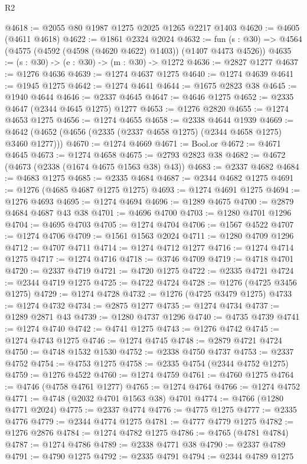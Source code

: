 \begin{lexlean}{R2}
\begin{coremodule}
@4618 := @2055 @80 @1987 @1275 @2025 @1265 @2217 @1403
@4620 := @4605 (@4611 @4618)
@4622 := @1861 @2324 @2024
@4632 := fun (s : @30) => @4564 (@4575 (@4592 (@4598 (@4620 @4622) @1403)) (@1407 @4473 @4526))
@4635 := (s : @30) -> (e : @30) -> (m : @30) -> @1272
@4636 := @2827 @1277
@4637 := @1276 @4636
@4639 := @1274 @4637 @1275
@4640 := @1274 @4639
@4641 := @1945 @1275
@4642 := @1274 @4641
@4644 := @1675 @2823 @38
@4645 := @1940 @4644
@4646 := @2337 @4645
@4647 := @4646 @1275
@4652 := @2335 @4647 (@2344 @4645 @1275) @1277
@4653 := @1276 @2820
@4655 := @1274 @4653 @1275
@4656 := @1274 @4655
@4658 := @2338 @4644 @1939
@4669 := @4642 (@4652 (@4656 (@2335 (@2337 @4658 @1275) (@2344 @4658 @1275) @3460 @1277)))
@4670 := @1274 @4669
@4671 := Bool.or
@4672 := @4671 @4645
@4673 := @1274 @4658
@4675 := @2793 @2823 @38
@4682 := @4672 (@4673 (@2338 (@1674 @4675 @1563 @38) @43))
@4683 := @2337 @4682
@4684 := @4683 @1275
@4685 := @2335 @4684
@4687 := @2344 @4682 @1275
@4691 := @1276 (@4685 @4687 @1275 @1275)
@4693 := @1274 @4691 @1275
@4694 := @1276 @4693
@4695 := @1274 @4694
@4696 := @1289 @4675
@4700 := @2879 @4684 @4687 @43 @38
@4701 := @4696 @4700
@4703 := @1280 @4701 @1296
@4704 := @4695 @4703
@4705 := @1274 @4704
@4706 := @1567 @4522
@4707 := @1274 @4706
@4709 := @1561 @1563 @2024
@4711 := @1280 @4709 @1296
@4712 := @4707 @4711
@4714 := @1274 @4712 @1277
@4716 := @1274 @4714 @1275
@4717 := @1274 @4716
@4718 := @3746 @4709
@4719 := @4718 @4701
@4720 := @2337 @4719
@4721 := @4720 @1275
@4722 := @2335 @4721
@4724 := @2344 @4719 @1275
@4725 := @4722 @4724
@4728 := @1276 (@4725 @3456 @1275)
@4729 := @1274 @4728
@4732 := @1276 (@4725 @3479 @1275)
@4733 := @1274 @4732
@4734 := @2875 @1277
@4735 := @1274 @4734
@4737 := @1289 @2871 @43
@4739 := @1280 @4737 @1296
@4740 := @4735 @4739
@4741 := @1274 @4740
@4742 := @4741 @1275
@4743 := @1276 @4742
@4745 := @1274 @4743 @1275
@4746 := @1274 @4745
@4748 := @2879 @4721 @4724
@4750 := @4748 @1532 @1530
@4752 := @2338 @4750 @4737
@4753 := @2337 @4752
@4754 := @4753 @1275
@4758 := @2335 @4754 (@2344 @4752 @1275)
@4759 := @1276 @4522
@4760 := @1274 @4759
@4761 := @4760 @1275
@4764 := @4746 (@4758 @4761 @1277)
@4765 := @1274 @4764
@4766 := @1274 @4752
@4771 := @4748 (@2032 @4701 @1563 @38) @4701
@4774 := @4766 (@1280 @4771 @2024)
@4775 := @2337 @4774
@4776 := @4775 @1275
@4777 := @2335 @4776
@4779 := @2344 @4774 @1275
@4781 := @4777 @4779 @1275
@4782 := @1276 @2876
@4784 := @1274 @4782 @1275
@4786 := @4765 (@4781 @4784)
@4787 := @1274 @4786
@4789 := @2338 @4771 @38
@4790 := @2337 @4789
@4791 := @4790 @1275
@4792 := @2335 @4791
@4794 := @2344 @4789 @1275

\end{coremodule}
\end{lexlean}
